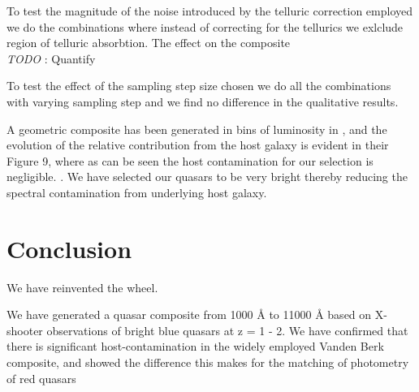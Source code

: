 \documentclass{aa}    %
\newcommand{\sectlabel}[1]{\label{sect:#1}}
\newcommand{\todo}[3]{{\color{#2}\emph{#1}: #3}}
\newcommand{\jstodo}[1]{\todo{ \\TODO }{green}{#1}}
\begin{document}
To test the magnitude of the noise introduced by the telluric correction employed we do the combinations where instead of correcting for the tellurics we exlclude region of telluric absorbtion. The effect on the composite  
\jstodo{Quantify}


To test the effect of the sampling step size chosen we do all the combinations with varying sampling step and we find no difference in the qualitative results. 

 
 
A geometric composite has been generated in bins of luminosity in \citep{Shen2011}, and the evolution of the relative contribution from the host galaxy is evident in their Figure 9, where as can be seen the host contamination for our selection is negligible.
 \citep{Volonteri2010a} \citep{Hopkins2007} . We have selected our quasars to be very bright thereby reducing the spectral contamination from underlying host galaxy. 









\section{Conclusion}  \sectlabel{conclusion}


We have reinvented the wheel.

We have generated a quasar composite from 1000 \r{A} to 11000 \r{A} based on X-shooter observations of bright blue quasars at z = 1 - 2. We have confirmed that there is significant host-contamination in the widely employed Vanden Berk composite, and showed the difference this makes for the matching of photometry of red quasars


%
 

%
%


%





\appendix

\end{document}
